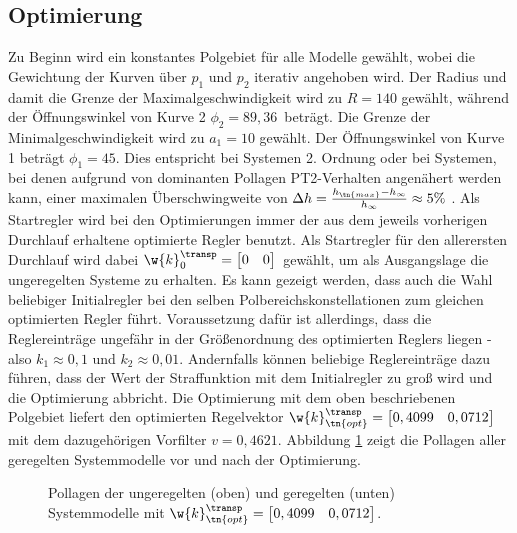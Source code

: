 \subsection{Optimierung}\label{sec:optimierung}
Zu Beginn wird ein konstantes Polgebiet für alle Modelle gewählt, wobei die Gewichtung der Kurven über $p_1$ und $p_2$ iterativ angehoben wird. Der Radius und damit die Grenze der Maximalgeschwindigkeit wird zu $R=140$ gewählt, während der Öffnungswinkel von Kurve 2 $\phi_2=89,36$\textdegree \, beträgt. Die Grenze der Minimalgeschwindigkeit wird zu $a_1 = 10$ gewählt. Der Öffnungswinkel von Kurve 1 beträgt $\phi_1=45$\textdegree. Dies entspricht bei Systemen 2. Ordnung oder bei Systemen, bei denen aufgrund von dominanten Pollagen PT2-Verhalten angenähert werden kann, einer maximalen Überschwingweite von $\Delta h=\frac{h_\tn{max}-h_\infty}{h_\infty}\approx5\%$ \cite{Adamy.2016}.
Als Startregler wird bei den Optimierungen immer der aus dem jeweils vorherigen Durchlauf erhaltene optimierte Regler benutzt. Als Startregler für den allerersten Durchlauf wird dabei $\w{k}_0^\transp = \begin{bmatrix}	0 & 0 \\ \end{bmatrix} \, $ gewählt, um als Ausgangslage die ungeregelten Systeme zu erhalten. Es kann gezeigt werden, dass auch die Wahl beliebiger Initialregler bei den selben Polbereichskonstellationen zum gleichen optimierten Regler führt. Voraussetzung dafür ist allerdings, dass die Reglereinträge ungefähr in der Größenordnung des optimierten Reglers liegen - also $k_1 \approx 0,1$ und $k_2 \approx 0,01$. Andernfalls können beliebige Reglereinträge dazu führen, dass der Wert der Straffunktion mit dem Initialregler zu groß wird und die Optimierung abbricht. Die Optimierung mit dem oben beschriebenen Polgebiet liefert den optimierten Regelvektor $\w{k}_\tn{opt}^\transp = \begin{bmatrix} 0,4099 & 0,0712 \\ \end{bmatrix} \, $ mit dem dazugehörigen Vorfilter $v = 0,4621$. Abbildung \ref{fig:pollage04099} zeigt die Pollagen aller geregelten Systemmodelle vor und nach der Optimierung. 
\begin{figure}[H]
	\centering
	\caption[pollage04099]{Pollagen der ungeregelten (oben) und geregelten (unten) Systemmodelle mit $\w{k}_\tn{opt}^\transp = \begin{bmatrix}	0,4099 & 0,0712 \\ \end{bmatrix} $.}
	\label{fig:pollage04099}
\end{figure}
